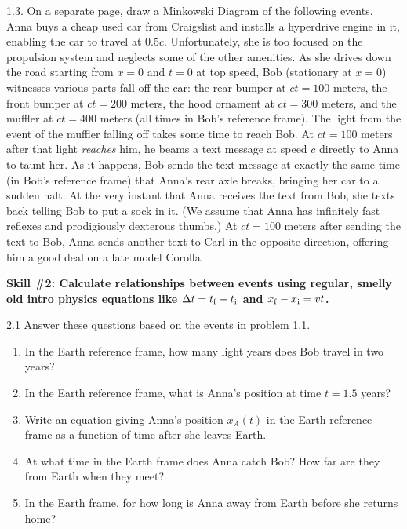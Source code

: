 1.3. On a separate page, draw a Minkowski Diagram of the following events.  Anna buys a cheap used car from Craigslist and installs a hyperdrive engine in it, enabling the car to travel at $0.5 c$.  Unfortunately, she is too focused on the propulsion system and neglects some of the other amenities.  
As she drives down the road starting from $x=0$ and $t=0$ at top speed, Bob (stationary at $x=0$) witnesses various parts fall off the car: 
the rear bumper at $ct=100$ meters, the front bumper at $ct=200$ meters, the hood ornament at $ct=300$ meters, and the muffler at $ct=400$ meters (all times in Bob's reference frame).  
The light from the event of the muffler falling off takes some time to reach Bob.  
At $ct=100$ meters after that light \textit{reaches} him, he beams a text message at speed $c$ directly to Anna to taunt her.  As it happens, Bob sends the text message at exactly the same time (in Bob's reference frame) that Anna's rear axle breaks, bringing her car to a sudden halt.  At the very instant that Anna receives the text from Bob, she texts back telling Bob to put a sock in it.  (We assume that Anna has infinitely fast reflexes and prodigiously dexterous thumbs.)  
At $ct=100$ meters after sending the text to Bob, Anna sends another text to Carl in the opposite direction, offering him a good deal on a late model Corolla.  
\bigskip



\textbf{Skill \#2: Calculate relationships between events using regular, smelly old intro physics equations like \boldmath$ \Delta t=t_{\rm f}-t_{\rm i}$ and \boldmath${x_{\rm f} - x_{\rm i} = vt}$.}

2.1 Answer these questions based on the events in problem 1.1.
\begin{enumerate}[nosep,label=(\emph{\alph*})]
\item In the Earth reference frame, how many light years does Bob travel in two years?
\answerspace{0.3in}

\item In the Earth reference frame, what is Anna's position at time $t=1.5$ years?
\answerspace{0.3in}

\item Write an equation giving Anna's position $x_A(t)$ in the Earth reference frame as a function of time after she leaves Earth.
\answerspace{0.3in}

\item At what time in the Earth frame does Anna catch Bob?  How far are they from Earth when they meet?
\answerspace{0.3in}

\item In the Earth frame, for how long is Anna away from Earth before she returns home?
\answerspace{0.3in}

\end{enumerate}

